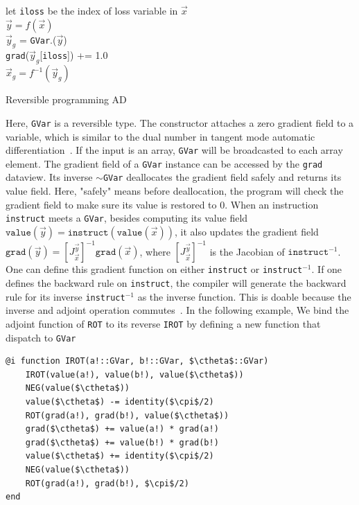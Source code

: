 \documentclass[aps,twocolumn,longbibliography,english,superscriptaddress]{revtex4-1}
\newcommand{\<}{\langle}
\renewcommand{\>}{\rangle}
\newcommand{\vx}{{\vec x}}
\newcommand{\vy}{{\vec y}}
\newcommand{\vvalue}{{\texttt{value}}}
\newcommand{\grad}{{\texttt{grad}}}
\newcommand{\ctheta}{{\color{jlbase}{\rm \theta}}}
\newcommand{\cpi}{{\color{jlbase}{\rm \pi}}}
\theoremstyle{definition}\newtheorem{definition}{\textit{Definition}}
\begin{document}
\begin{algorithm}[H]
    \KwResult{\grad.($\vx_g$)}
    let \texttt{iloss} be the index of loss variable in $\vx$\\
    $\vy = f(\vx)$\\
    $\vy_g$ = \texttt{GVar}.($\vy$)\\
    \grad($\vy_g$[\texttt{iloss}]) += 1.0\\
    $\vx_g= f^{-1}(\vy_g)$
    \caption{Reversible programming AD}\label{alg:ad}
\end{algorithm}

Here, \texttt{GVar} is a reversible type. The constructor attaches a zero gradient field to a variable, which is similar to the dual number in tangent mode automatic differentiation~\cite{Revels2016}. If the input is an array, \texttt{GVar} will be broadcasted to each array element. The gradient field of a \texttt{GVar} instance can be accessed by the \texttt{grad} dataview. Its inverse \texttt{$\sim$GVar} deallocates the gradient field safely and returns its value field. Here, "safely" means before deallocation, the program will check the gradient field to make sure its value is restored to $0$.
When an instruction \texttt{instruct} meets a \texttt{GVar}, besides computing its value field $\vvalue(\vy) = \texttt{instruct}(\vvalue(\vx))$, it also updates the gradient field $\grad(\vy) = \left[J^{\vy}_{\vx}\right]^{-1} \grad(\vx)$, where $\left[J^{\vy}_{\vx}\right]^{-1}$ is the Jacobian of $\texttt{instruct}^{-1}$. One can define this gradient function on either \texttt{instruct} or \texttt{instruct${}^{-1}$}. If one defines the backward rule on \texttt{instruct}, the compiler will generate the backward rule for its inverse \texttt{instruct${}^{-1}$} as the inverse function. This is doable because the inverse and adjoint operation commutes~\cite{Mcinerney2015}. In the following example, We bind the adjoint function of \texttt{ROT} to its reverse \texttt{IROT} by defining a new function that dispatch to \texttt{GVar}

\begin{minipage}{.44\textwidth}
    \begin{lstlisting}[mathescape=true]
@i function IROT(a!::GVar, b!::GVar, $\ctheta$::GVar)
    IROT(value(a!), value(b!), value($\ctheta$))
    NEG(value($\ctheta$))
    value($\ctheta$) -= identity($\cpi$/2)
    ROT(grad(a!), grad(b!), value($\ctheta$))
    grad($\ctheta$) += value(a!) * grad(a!)
    grad($\ctheta$) += value(b!) * grad(b!)
    value($\ctheta$) += identity($\cpi$/2)
    NEG(value($\ctheta$))
    ROT(grad(a!), grad(b!), $\cpi$/2)
end
\end{lstlisting}
\end{minipage}
\end{document}
